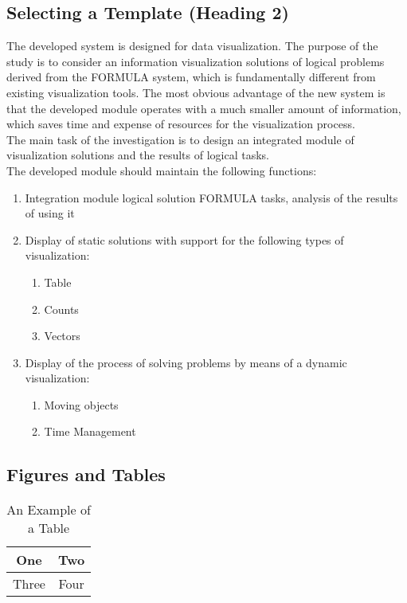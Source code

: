 \documentclass[a4paper, 10pt, conference]{ieeeconf}
\begin{document}
\subsection{Selecting a Template (Heading 2)}
The developed system is designed for data visualization. The purpose of the study is to consider an information visualization solutions of logical problems derived from the FORMULA system, which is fundamentally different from existing visualization tools. The most obvious advantage of the new system is that the developed module operates with a much smaller amount of information, which saves time and expense of resources for the visualization process.
\\The main task of the investigation is to design an integrated module of visualization solutions and the results of logical tasks.
\\The developed module should maintain the following functions:
\begin{enumerate}
\item Integration module logical solution FORMULA tasks, analysis of the results of using it
\item Display of static solutions with support for the following types of visualization:
\begin{enumerate}
\item Table
\item Counts
\item Vectors
\end{enumerate}
\item Display of the process of solving problems by means of a dynamic visualization:
\begin{enumerate}
\item Moving objects
\item Time Management
\end{enumerate}
\end{enumerate}

\subsection{Figures and Tables}

\begin{table}[h]
\caption{An Example of a Table}
\label{table_example}
\begin{center}
\begin{tabular}{|c||c|}
\hline
One & Two\\
\hline
Three & Four\\
\hline
\end{tabular}
\end{center}
\end{table}
\end{document}
